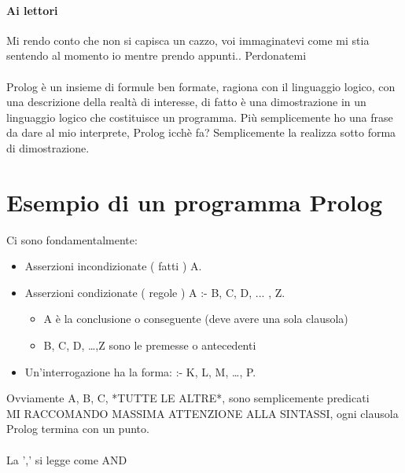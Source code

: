 \documentclass[12pt, a4paper, openany, oneside]{book}
\begin{document}
\paragraph{Ai lettori} Mi rendo conto che non si capisca un cazzo, voi 
immaginatevi come mi stia sentendo al momento io mentre prendo appunti.. 
Perdonatemi
\\ \\
Prolog è un insieme di formule ben formate, ragiona con il linguaggio logico, 
con una descrizione della realtà di interesse, di fatto è una dimostrazione in 
un linguaggio logico che costituisce un programma. Più semplicemente ho una  
frase da dare al mio interprete, Prolog icchè fa? Semplicemente la realizza  
sotto forma di dimostrazione. 
\\ 
\section{Esempio di un programma Prolog}
Ci sono fondamentalmente:
\begin{itemize}
	\item Asserzioni incondizionate (\color{red} fatti \color{black})
	A.
	\item Asserzioni condizionate (\color{red} regole \color{black})
	A :- B, C, D, ... , Z.
	\begin{itemize}
		\item A è la conclusione o conseguente (deve avere una sola clausola)
		\item B, C, D, \dots,Z sono le premesse o antecedenti 
	\end{itemize} 
	\item Un'\color{red}interrogazione \color{black} ha la forma: :- K, L, M, 
	\dots, P. \\
\end{itemize}
Ovviamente A, B, C, *TUTTE LE ALTRE*, sono semplicemente predicati
\\
MI RACCOMANDO MASSIMA ATTENZIONE ALLA SINTASSI, ogni clausola Prolog termina
con un punto. \\ \\
La ',' si legge come AND
\end{document}
